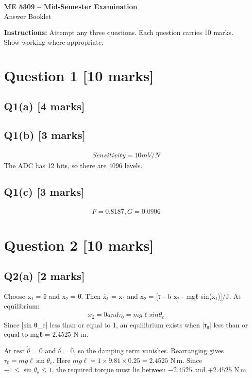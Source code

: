 \documentclass[11pt,a4paper]{article}
\begin{document}
\begin{center}
{\Large\bfseries ME 5309 -- Mid-Semester Examination}\\[3pt]
{\large Answer Booklet}\\[8pt]
\end{center}
\textbf{Instructions:} Attempt any three questions. Each question carries 10 marks. Show working where appropriate.
\section*{Question 1 \hfill [10 marks]}
\subsection*{Q1(a) \hfill [4 marks]}

\vspace{2mm}

\subsection*{Q1(b) \hfill [3 marks]}

\[\begin{aligned}Sensitivity = 10 mV/N\end{aligned}\]
The ADC has 12 bits, so there are 4096 levels.

\subsection*{Q1(c) \hfill [3 marks]}

\[\begin{aligned}F = 0.8187, G = 0.0906\end{aligned}\]

\section*{Question 2 \hfill [10 marks]}
\subsection*{Q2(a) \hfill [2 marks]}

Choose x₁ = θ and x₂ = θ̇.
Then ẋ₁ = x₂ and ẋ₂ = [τ - b x₂ - mgℓ sin(x₁)]/J.
At equilibrium:\[\begin{aligned}x_2 = 0 and τ_0 = mg\ell sin \theta_e\end{aligned}\]
Since |sin θ\_e| less than or equal to 1, an equilibrium exists when |τ₀| less than or equal to mgℓ = 2.4525 N m.\par\smallskip At rest $\dot\theta=0$ and $\ddot\theta=0$, so the damping term vanishes. Rearranging gives $\tau_0=mg\ell\sin\theta_e$. Here $mg\ell=1\times9.81\times0.25=2.4525$ N\,m. Since $-1\leq\sin\theta_e\leq1$, the required torque must lie between $-2.4525$ and $+2.4525$ N\,m.
\end{document}
